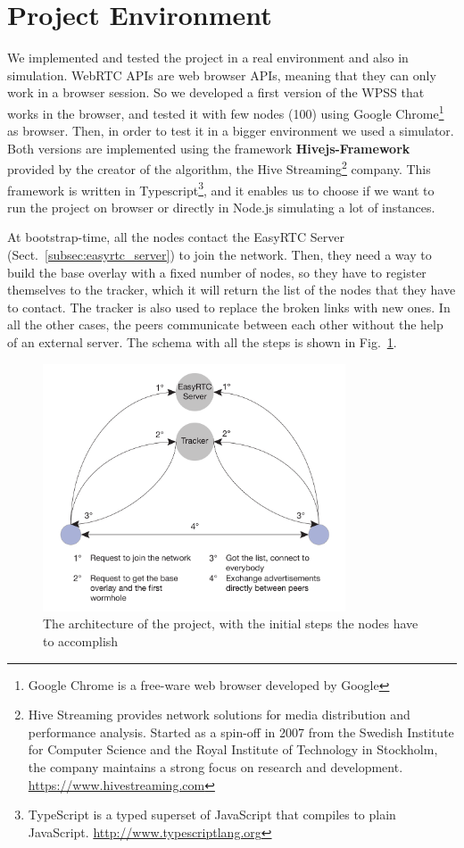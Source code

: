 \section{Project Environment}
\label{cha:design}
We implemented and tested the project in a real environment and also in simulation. WebRTC APIs are web browser APIs, meaning that they can only work in a browser session. So we developed a first version of the WPSS that works in the browser, and tested it with few nodes (100) using Google Chrome\footnote{Google Chrome is a free-ware web browser developed by Google} as browser. Then, in order to test it in a bigger environment we used a simulator. Both versions are implemented using the framework \textbf{Hivejs-Framework} provided by the creator of the algorithm, the Hive Streaming\footnote{Hive Streaming provides network solutions for media distribution and performance analysis. Started as a spin-off in 2007 from the Swedish Institute for Computer Science and the Royal Institute of Technology in Stockholm, the company maintains a strong focus on research and development. \url{https://www.hivestreaming.com}} company. This framework is written in Typescript\footnote{TypeScript is a typed superset of JavaScript that compiles to plain JavaScript. \url{http://www.typescriptlang.org}}, and it enables us to choose if we want to run the project on browser or directly in Node.js simulating a lot of instances. 

At bootstrap-time, all the nodes contact the EasyRTC Server (Sect.~\ref{subsec:easyrtc_server}) to join the network. Then, they need a way to build the base overlay with a fixed number of nodes, so they have to register themselves to the tracker, which it will return the list of the nodes that they have to contact. The tracker is also used to replace the broken links with new ones. In all the other cases, the peers communicate between each other without the help of an external server. The schema with all the steps is shown in Fig.~\ref{fig:project_architecture}.

\begin{figure}[ht]
  \centering
  \includegraphics[keepaspectratio=true, width=0.8\textwidth]{images/project_architecture}\caption{The architecture of the project, with the initial steps the nodes have to accomplish}
  \label{fig:project_architecture}
\end{figure}


